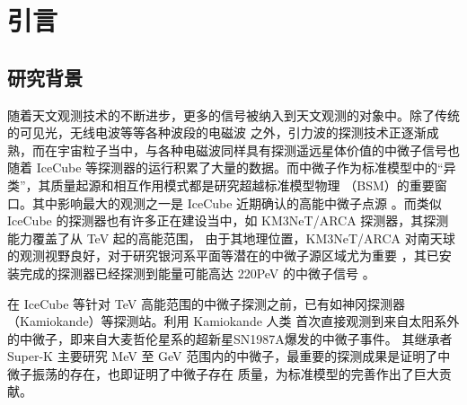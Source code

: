 \documentclass[UTF8]{ctexart}
\author{朝色}
\begin{document}
\begin{abstract}
  随着多信使天文学的发展，IceCube 探测器在近期确认了活动星系核（AGN）NGC 1068 作为高能中微子点源。然而，结合现
  有的 $\gamma$ 射线观测数据，传统的电磁级联模型在解释其核心区域的遮蔽现象时存在一定困难。本文基于重中性轻子（HNL）
  模型，探讨了其作为解释这一多信使观测结果潜在机制的可能性。
  本文首先通过 Inversed Seesaw （ISS）机制引入HNL，详细计算了在AGN高能环境中，不同质量的 HNL 通过$\pi$介子和$\mu$子衰变的产生时，
  相比较于产生标准模型中微子的分支比，以及产生 HNL 粒子在母粒子静止系下的螺旋度分布、不同螺旋度的 HNL 粒子在轻子衰变与辐射衰变通道中产物的能谱分布。
  随后，将该理论模型应用于 NGC 1068 的实际观测数据中，估算了 HNL 输运并转化
  为$\gamma$射线的过程。研究结果表明，如果HNL仅通过ISS机制的轻子衰变产生次级电子并经逆康普顿散射转化为 $\gamma$ 射线，
  其通量远低于现有探测阈值；但若 HNL 存在占主导的偶极辐射衰变通道，则能够部分解释观测到的 $\gamma$ 射线信号，并由此可
  以对 HNL 与 $\nu_\mu$ 的混合角 $|U_\mu|^2$ 给出相应的参数空间上限限制。
  
  \vspace{1em}
  \noindent \textbf{关键词：} HNL, AGN, NGC 1068, 多信使天文学, ISS
\end{abstract}

\newpage
\section{引言}

\subsection{研究背景}

随着天文观测技术的不断进步，更多的信号被纳入到天文观测的对象中。除了传统的可见光，无线电波等等各种波段的电磁波
之外，引力波的探测技术正逐渐成熟，而在宇宙粒子当中，与各种电磁波同样具有探测遥远星体价值的中微子信号也随着 IceCube
等探测器的运行积累了大量的数据。而中微子作为标准模型中的“异类”，其质量起源和相互作用模式都是研究超越标准模型物理
（BSM）的重要窗口。其中影响最大的观测之一是 IceCube 近期确认的高能中微子点源 \cite{icecube2022evidence}。而类似
IceCube 的探测器也有许多正在建设当中，如 KM3NeT/ARCA 探测器，其探测能力覆盖了从 TeV 起的高能范围，
由于其地理位置，KM3NeT/ARCA 对南天球的观测视野良好，对于研究银河系平面等潜在的中微子源区域尤为重要
\cite{km3net2024astronomy}，其已安装完成的探测器已经探测到能量可能高达 220PeV 的中微子信号
\cite{km3net2025observation}。

在 IceCube 等针对 TeV 高能范围的中微子探测之前，已有如神冈探测器（Kamiokande）等探测站。利用 Kamiokande 人类
首次直接观测到来自太阳系外的中微子，即来自大麦哲伦星系的超新星SN1987A爆发的中微子事件\cite{hirata1988observation}。
其继承者 Super-K 主要研究 MeV 至 GeV 范围内的中微子，最重要的探测成果是证明了中微子振荡的存在，也即证明了中微子存在
质量，为标准模型的完善作出了巨大贡献\cite{fukuda1998evidence}。
\end{document}
